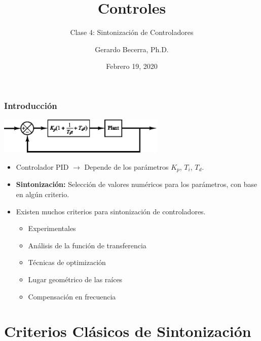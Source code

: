 \documentclass[aspectratio=169,handout]{beamer}
\title{Controles}
\subtitle{\small Clase 4: Sintonización de Controladores}
\author{Gerardo Becerra, Ph.D.}
\institute{Pontificia Universidad Javeriana\\ Departamento de Electrónica}
\date{Febrero 19, 2020}
\theoremstyle{definition}
\theoremstyle{plain}
\theoremstyle{remark}
\begin{document}
\frame{\titlepage}	


\begin{frame}[<+->]\frametitle{Introducción}
\vspace*{5mm}
\centering
\includegraphics[width=8cm]{images/PIDController.eps}
\begin{itemize}
	\item Controlador PID $\rightarrow$ Depende de los parámetros $K_p$, $T_i$, $T_d$.
	\item \textbf{Sintonización:} Selección de valores numéricos para los parámetros, con base en algún criterio.
	\item Existen muchos criterios para sintonización de controladores.
	\begin{itemize}
		\item Experimentales
		\item Análisis de la función de transferencia
		\item Técnicas de optimización
		\item Lugar geométrico de las raíces
		\item Compensación en frecuencia
	\end{itemize}
\end{itemize}
\end{frame}

\section{Criterios Clásicos de Sintonización}
\end{document}
